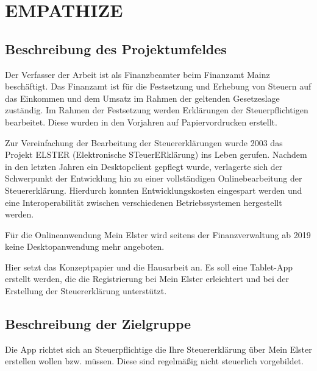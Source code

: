 


\section{EMPATHIZE}\label{EMPATHIZE}
\subsection{Beschreibung des Projektumfeldes}\label{Beschreibung des Projektumfeldes}
Der Verfasser der Arbeit ist als Finanzbeamter beim Finanzamt Mainz beschäftigt.
Das Finanzamt ist für die Festsetzung und Erhebung von Steuern auf das Einkommen und dem Umsatz im Rahmen der geltenden Gesetzeslage zuständig. Im Rahmen der Festsetzung werden Erklärungen der Steuerpflichtigen bearbeitet. Diese wurden in den Vorjahren auf Papiervordrucken erstellt. 

Zur Vereinfachung der Bearbeitung der Steuererklärungen wurde 2003 das Projekt ELSTER (\grq{}Elektronische STeuerERklärung\grq{}) ins Leben gerufen. Nachdem in den letzten Jahren ein Desktopclient gepflegt wurde, verlagerte sich der Schwerpunkt der Entwicklung hin zu einer vollständigen Onlinebearbeitung der Steuererklärung. Hierdurch konnten Entwicklungskosten eingespart werden und eine Interoperabilität zwischen verschiedenen Betriebssystemen hergestellt werden.

Für die Onlineanwendung \grq{}Mein Elster\grq{} wird seitens der Finanzverwaltung ab 2019 keine Desktopanwendung mehr angeboten. 

Hier setzt das Konzeptpapier und die Hausarbeit an. Es soll eine Tablet-App erstellt werden, die die Registrierung bei \grq{}Mein Elster\grq{} erleichtert und bei der Erstellung der Steuererklärung unterstützt.




\subsection{Beschreibung der Zielgruppe}\label{Beschreibung der Zielgruppe}
Die App richtet sich an Steuerpflichtige die Ihre Steuererklärung über \grq{}Mein Elster\grq{} erstellen wollen bzw. müssen.
Diese sind regelmäßig nicht steuerlich vorgebildet. 



